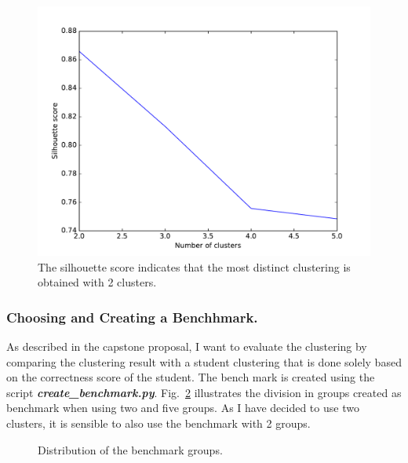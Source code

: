     \begin{figure}
    	\centering
    	\includegraphics[width=.5\textwidth]{./img/silhouette.pdf}
    	\caption{The silhouette score indicates that the most distinct clustering is obtained with 2 clusters.\label{fig_silhouette}}
    \end{figure}
    
\subsubsection{Choosing and Creating a Benchhmark.}
As described in the capstone proposal, I want to evaluate the clustering by comparing the clustering result with a student clustering that is done solely based on the correctness score of the student. The bench mark is created using the script \textbf{\emph{create\_benchmark.py}}. Fig.~\ref{fig_bench} illustrates the division in groups created as benchmark when using two and five groups. As I have decided to use two clusters, it is sensible to also use the benchmark with 2 groups.


\begin{figure}[h]
	\centering
	\caption{Distribution of the benchmark groups.\label{fig_bench}}		
\end{figure}


